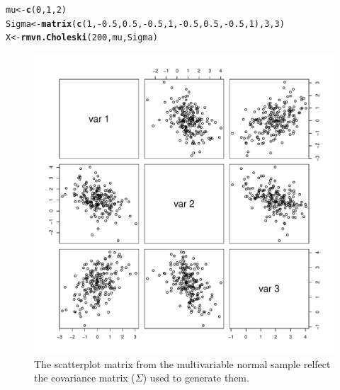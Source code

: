 \documentclass{article}\usepackage[]{graphicx}\usepackage[]{color}
\makeatletter
\def\maxwidth{ %
  \ifdim\Gin@nat@width>\linewidth
    \linewidth
  \else
    \Gin@nat@width
  \fi
}
\newcommand{\hlkwd}[1]{\textcolor[rgb]{0.737,0.353,0.396}{\textbf{#1}}}%
\newenvironment{kframe}{%
 \def\at@end@of@kframe{}%
 \ifinner\ifhmode%
  \def\at@end@of@kframe{\end{minipage}}%
  \begin{minipage}{\columnwidth}%
 \fi\fi%
 \def\FrameCommand##1{\hskip\@totalleftmargin \hskip-\fboxsep
 \colorbox{shadecolor}{##1}\hskip-\fboxsep
     \hskip-\linewidth \hskip-\@totalleftmargin \hskip\columnwidth}%
 \MakeFramed {\advance\hsize-\width
   \@totalleftmargin\z@ \linewidth\hsize
   \@setminipage}}%
 {\par\unskip\endMakeFramed%
 \at@end@of@kframe}
\newenvironment{knitrout}{}{} %
\makeatother
\begin{document}
\begin{itemize}
\begin{knitrout}
\begin{kframe}
\begin{alltt}
mu <- \hlkwd{c}(0, 1, 2)
Sigma <- \hlkwd{matrix}(\hlkwd{c}(1, -0.5, 0.5, -0.5, 1, -0.5, 0.5, -0.5, 1), 3, 3)
X <- \hlkwd{rmvn.Choleski}(200, mu, Sigma)
\end{alltt}
\end{kframe}
\end{knitrout}

\begin{figure}
\begin{knitrout}
\color{fgcolor}
\includegraphics[width=\maxwidth]{figure/pplot} 

\end{knitrout}

\caption{The scatterplot matrix from the multivariable normal sample relfect the covariance matrix ($\Sigma$) used to generate them.}
\label{mvplot}
\end{figure}


\end{itemize}
\end{document}

